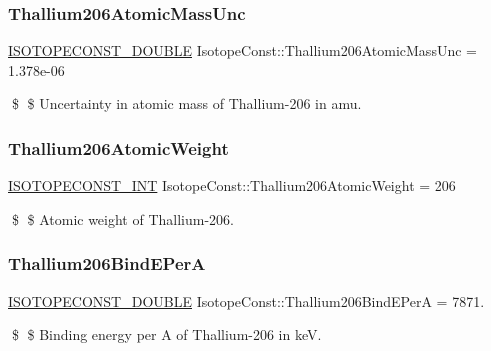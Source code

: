 \subsubsection{\texorpdfstring{Thallium206\+Atomic\+Mass\+Unc}{Thallium206AtomicMassUnc}}
{\footnotesize\ttfamily \mbox{\hyperlink{group___isotope_const-_macros_ga8f45a7272ce02c0b4c65c44636ed719a}{I\+S\+O\+T\+O\+P\+E\+C\+O\+N\+S\+T\+\_\+\+D\+O\+U\+B\+LE}} Isotope\+Const\+::\+Thallium206\+Atomic\+Mass\+Unc = 1.\+378e-\/06}

\$ \$ Uncertainty in atomic mass of Thallium-\/206 in amu. \mbox{\label{group___isotope_const-_thallium-_tl206_gafe027611d2ff15e42b1b74e80df6ed1b}} 
\subsubsection{\texorpdfstring{Thallium206\+Atomic\+Weight}{Thallium206AtomicWeight}}
{\footnotesize\ttfamily \mbox{\hyperlink{group___isotope_const-_macros_ga5f18360b3e99483a35c32d789e62621c}{I\+S\+O\+T\+O\+P\+E\+C\+O\+N\+S\+T\+\_\+\+I\+NT}} Isotope\+Const\+::\+Thallium206\+Atomic\+Weight = 206}

\$ \$ Atomic weight of Thallium-\/206. \mbox{\label{group___isotope_const-_thallium-_tl206_gab6040aae696af4d78f8d14e6dc3b5984}} 
\subsubsection{\texorpdfstring{Thallium206\+Bind\+E\+PerA}{Thallium206BindEPerA}}
{\footnotesize\ttfamily \mbox{\hyperlink{group___isotope_const-_macros_ga8f45a7272ce02c0b4c65c44636ed719a}{I\+S\+O\+T\+O\+P\+E\+C\+O\+N\+S\+T\+\_\+\+D\+O\+U\+B\+LE}} Isotope\+Const\+::\+Thallium206\+Bind\+E\+PerA = 7871.}

\$ \$ Binding energy per A of Thallium-\/206 in keV. \mbox{\label{group___isotope_const-_thallium-_tl206_gaf0262540b53751b1f7dc57830770fb7d}} 
